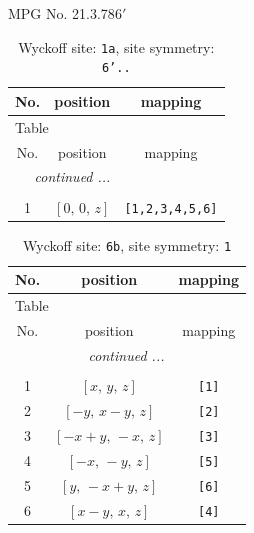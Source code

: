 \documentclass[fleqn,8pt]{jsarticle}
\begin{document}
\setcounter{MaxMatrixCols}{32}

\renewcommand{\tablename}{Table~}
\renewcommand{\figurename}{Figure~}
\begin{center}
\LARGE
MPG No. 21.3.78\quad$6'$
\end{center}
\renewcommand{\arraystretch}{1.2}
\begin{longtable}{ccc}
\caption{Wyckoff site: {\tt 1a}, site symmetry: {\tt 6'..}}
 \\
 \hline \hline
No. & position & mapping \\ \hline \endfirsthead

\multicolumn{2}{l}{\tablename\ \thetable{}} \\
 \hline \hline
No. & position & mapping \\ \hline \endhead

 \hline \hline
\multicolumn{2}{r}{\footnotesize\it continued ...} \\ \endfoot

 \hline \hline
\multicolumn{2}{r}{} \\ \endlastfoot

1 & $\left[ 0,\, 0,\, z \right]$ & {\tt [1,2,3,4,5,6]} \\
\end{longtable}
\renewcommand{\arraystretch}{1.2}
\begin{longtable}{ccc}
\caption{Wyckoff site: {\tt 6b}, site symmetry: {\tt 1}}
 \\
 \hline \hline
No. & position & mapping \\ \hline \endfirsthead

\multicolumn{2}{l}{\tablename\ \thetable{}} \\
 \hline \hline
No. & position & mapping \\ \hline \endhead

 \hline \hline
\multicolumn{2}{r}{\footnotesize\it continued ...} \\ \endfoot

 \hline \hline
\multicolumn{2}{r}{} \\ \endlastfoot

1 & $\left[ x,\, y,\, z \right]$ & {\tt [1]} \\ \hline
2 & $\left[ - y,\, x - y,\, z \right]$ & {\tt [2]} \\ \hline
3 & $\left[ - x + y,\, - x,\, z \right]$ & {\tt [3]} \\ \hline
4 & $\left[ - x,\, - y,\, z \right]$ & {\tt [5]} \\ \hline
5 & $\left[ y,\, - x + y,\, z \right]$ & {\tt [6]} \\ \hline
6 & $\left[ x - y,\, x,\, z \right]$ & {\tt [4]} \\
\end{longtable}
\end{document}
